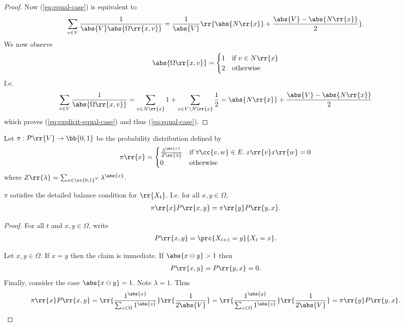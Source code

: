 \documentclass{article}
\begin{document}
\begin{claim*}[1]
\begin{proof}
    Now (\ref{eq:equal-case}) is equivalent to
    \begin{align}
      \label{eq:explicit-equal-case}
      \sum_{v\in V} \frac{1}{\abs{V}\abs{\Omega\rr{x,v}}} = \frac{1}{\abs{V}} \rr{\abs{N\rr{x}} + \frac{\abs{V}-\abs{N\rr{x}}}{2}}.
    \end{align}
    We now observe
    \begin{align*}
      \abs{\Omega\rr{x,v}} =
      \begin{cases}
        1 & \text{if } v\in N\rr{x} \\
        2 & \text{otherwise}
      \end{cases}
    \end{align*}
    I.e.
    \begin{align*}
      \sum_{v\in V} \frac{1}{\abs{\Omega\rr{x,v}}} = \sum_{v\in N\rr{x}} 1 + \sum_{v\in V\setminus N\rr{x}} \frac{1}{2} =  \abs{N\rr{x}} + \frac{\abs{V}-\abs{N\rr{x}}}{2}
    \end{align*}
    which proves (\ref{eq:explicit-equal-case}) and thus (\ref{eq:equal-case}).
  \end{proof}
\end{claim*}

Let $\pi:\mathcal P\rr{V}\to\bb{0,1}$ be the probability distribution defined by
\begin{align*}
  \pi\rr{x}=
  \begin{cases}
    \frac{\lambda^{\abs{x}}}{Z\rr{\lambda}} &\text{if }\forall \cc{v,w}\in E.\:x\rr{v}x\rr{w}=0 \\
    0 &\text{otherwise}
  \end{cases}
\end{align*}
where $Z\rr{\lambda}=\sum_{x\in\cc{0,1}^V} \lambda^{\abs{x}}$.



\begin{claim*}[2]
  $\pi$ satisfies the detailed balance condition for $\rr{X_t}$.
  I.e. for all $x,y\in\Omega$,
  \begin{align*}
    \pi\rr{x}P\rr{x,y}=\pi\rr{y}P\rr{y,x}.
  \end{align*}
  \begin{proof}
    For all $t$ and $x,y\in\Omega$, write
    \begin{align*}
      P\rr{x,y}=\prc{X_{t+1}=y}{X_t=x}.
    \end{align*}

    Let $x,y\in\Omega$. If $x=y$ then the claim is immediate. If $\abs{x\ominus y}>1$ then
    \begin{align*}
      P\rr{x,y}=P\rr{y,x}=0.
    \end{align*}
    Finally, consider the case $\abs{x\ominus y}=1$. Note $\lambda=1$. Thus
    \begin{align*}
      \pi\rr{x}P\rr{x,y}=\rr{\frac{1^{\abs{x}}}{\sum_{z\in\Omega} 1^{\abs{z}}}}\rr{\frac{1}{2\abs{V}}}
      =\rr{\frac{1^{\abs{y}}}{\sum_{z\in\Omega} 1^{\abs{z}}}}\rr{\frac{1}{2\abs{V}}}
      =\pi\rr{y}P\rr{y,x}.
    \end{align*}
  \end{proof}
\end{claim*}
\end{document}
